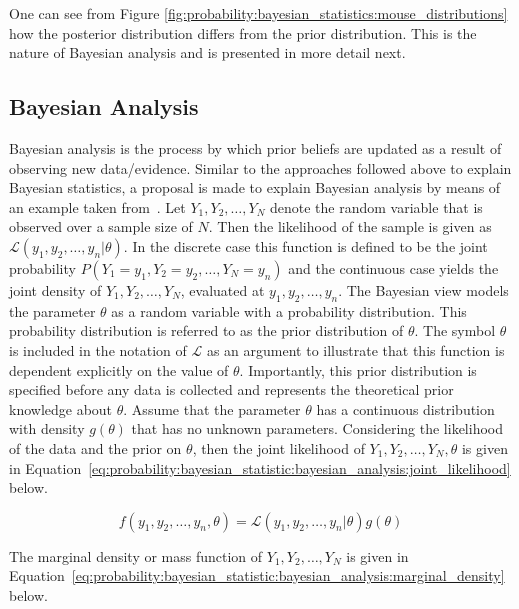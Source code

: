 One can see from Figure \ref{fig:probability:bayesian_statistics:mouse_distributions} how the posterior distribution differs from the prior distribution. This is the nature of Bayesian analysis and is presented in more detail next.

\subsection{Bayesian Analysis}
\label{sec:probability:bayesian_statistics:bayesian_analysis}

Bayesian analysis is the process by which prior beliefs are updated as a result of observing new data/evidence. Similar to the approaches followed above to explain Bayesian statistics, a proposal is made to explain Bayesian analysis by means of an example taken from~\cite{ref:wackerly:2014}. Let $Y_{1}, Y_{2}, \dots, Y_{N}$ denote the random variable that is observed over a sample size of $N$. Then the likelihood of the sample is given as $\mathcal{L}(y_{1}, y_{2}, \dots, y_{n} \vert \theta)$. In the discrete case this function is defined to be the joint probability $P(Y_{1} = y_{1}, Y_{2} = y_{2}, \dots, Y_{N} = y_{n})$ and the continuous case yields the joint density of $Y_{1}, Y_{2}, \dots, Y_{N}$, evaluated at $y_{1}, y_{2}, \dots, y_{n}$. The Bayesian view models the parameter $\theta$ as a random variable with a probability distribution. This probability distribution is referred to as the prior distribution of $\theta$. The symbol $\theta$ is included in the notation of $\mathcal{L}$ as an argument to illustrate that this function is dependent explicitly on the value of $\theta$. Importantly, this prior distribution is specified before any data is collected and represents the theoretical prior knowledge about $\theta$. Assume that the parameter $\theta$ has a continuous distribution with density $g(\theta)$ that has no unknown parameters. Considering the likelihood of the data and the prior on $\theta$, then the joint likelihood of $Y_{1}, Y_{2}, \dots, Y_{N}, \theta$ is given in Equation~\eqref{eq:probability:bayesian_statistic:bayesian_analysis:joint_likelihood} below.

\begin{equation}
      \label{eq:probability:bayesian_statistic:bayesian_analysis:joint_likelihood}
      f(y_{1}, y_{2}, \dots, y_{n}, \theta) = \mathcal{L}(y_{1}, y_{2}, \dots, y_{n} \vert \theta)g(\theta)
\end{equation}

The marginal density or mass function of $Y_{1}, Y_{2}, \dots, Y_{N}$ is given in Equation~\eqref{eq:probability:bayesian_statistic:bayesian_analysis:marginal_density} below.

